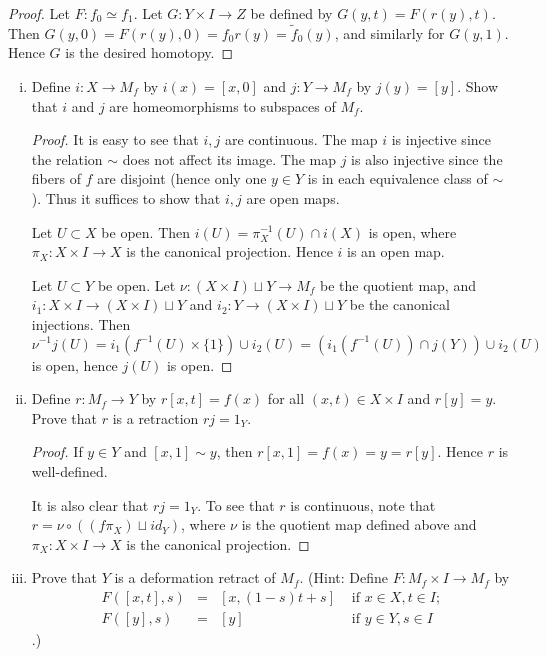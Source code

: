 \documentclass{article}
\begin{document}
\begin{proof}
Let $F: f_0 \simeq f_1$. Let $G: Y \times I \to Z$ be defined by $G(y,t) = F(r(y), t)$. Then 
$G(y,0) = F(r(y),0) = f_0r(y) = \tilde f_0(y)$, and similarly for $G(y,1)$. Hence $G$ is the desired homotopy.
\end{proof}


 \begin{enumerate}[(i)]
\item Define $i:X \to M_f$ by $i(x) = [x,0]$ and $j: Y \to M_f$ by $j(y) = [y]$. Show that
$i$ and $j$ are homeomorphisms to subspaces of $M_f$.
\begin{proof}
It is easy to see that $i,j$ are continuous. The map $i$ is injective since the relation $\sim$ does
not affect its image.  The map $j$ is also injective since the fibers of $f$ are disjoint (hence only
one $y \in Y$ is in each equivalence class of $\sim$). Thus it suffices to show that $i,j$ are open maps.

Let $U \subset X$ be open.  Then $i(U) = \pi_X^{-1}(U) \cap i(X)$ is open, where $\pi_X: X \times I \to X$ is the canonical projection.
Hence $i$ is an open map.

Let $U \subset Y$ be open.  Let $\nu: (X \times I ) \sqcup Y \to M_f$ be the quotient map, and
$i_1: X \times I \to  (X \times I ) \sqcup Y$ and $i_2: Y \to  (X \times I ) \sqcup Y$ be the 
canonical injections.   Then
$\nu^{-1}j(U) = i_1(f^{-1}(U) \times \{1\}) \cup i_2(U) = (i_1(f^{-1}(U)) \cap j(Y)) \cup i_2(U)$
is open, hence $j(U)$ is open.
\end{proof}

\item Define $r:M_f \to Y$ by $r[x,t] = f(x)$ for all $(x,t) \in X \times I$ and $r[y] = y$. Prove
that $r$ is a retraction $rj = 1_Y$.

\begin{proof}
If $y \in Y$ and $[x,1] \sim y$, then $r[x,1] = f(x) = y = r[y]$.  Hence $r$ is well-defined. 

It is also clear that $rj = 1_Y$.  To see that $r$ is continuous, note that $r = \nu \circ ((f\pi_X) \sqcup id_Y)$,
where $\nu$ is the quotient map defined above and $\pi_X:X \times I \to X$ is the canonical projection.
\end{proof}


\item Prove that $Y$ is a deformation retract of $M_f$. (Hint: Define $F:M_f \times I \to M_f$ by
\begin{align*}
F([x,t], s) & = & [x, (1-s)t+ s] & \text{ if } x \in X, t \in I; \\
F([y], s) & = & [y] & \text{ if } y \in Y, s \in I
\end{align*}
.)


\end{enumerate}
\end{document}
